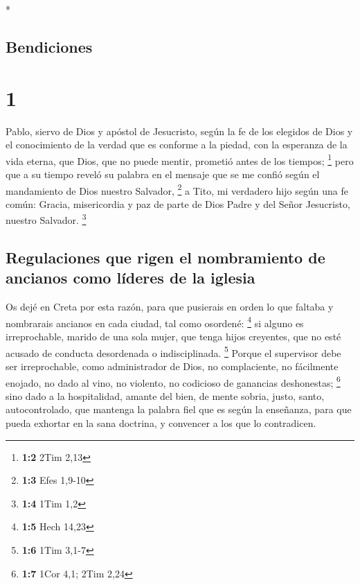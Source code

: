 \begin{paracol}{2} \switchcolumn[0]*

\hypertarget{bendiciones}{%
\subsection{Bendiciones}\label{bendiciones}}

\hypertarget{section}{%
\section{1}\label{section}}

 Pablo, siervo de Dios y apóstol de Jesucristo, según la
fe de los elegidos de Dios y el conocimiento de la verdad que es
conforme a la piedad,  con la esperanza de la vida eterna,
que Dios, que no puede mentir, prometió antes de los tiempos;
\footnote{\textbf{1:2} 2Tim 2,13}  pero que a su tiempo
reveló su palabra en el mensaje que se me confió según el mandamiento de
Dios nuestro Salvador, \footnote{\textbf{1:3} Efes 1,9-10}
 a Tito, mi verdadero hijo según una fe común: Gracia,
misericordia y paz de parte de Dios Padre y del Señor Jesucristo,
nuestro Salvador. \footnote{\textbf{1:4} 1Tim 1,2}

\hypertarget{regulaciones-que-rigen-el-nombramiento-de-ancianos-como-luxedderes-de-la-iglesia}{%
\subsection{Regulaciones que rigen el nombramiento de ancianos como
líderes de la
iglesia}\label{regulaciones-que-rigen-el-nombramiento-de-ancianos-como-luxedderes-de-la-iglesia}}

 Os dejé en Creta por esta razón, para que pusierais en
orden lo que faltaba y nombrarais ancianos en cada ciudad, tal como
osordené: \footnote{\textbf{1:5} Hech 14,23}  si alguno es
irreprochable, marido de una sola mujer, que tenga hijos creyentes, que
no esté acusado de conducta desordenada o indisciplinada. \footnote{\textbf{1:6}
  1Tim 3,1-7}  Porque el supervisor debe ser
irreprochable, como administrador de Dios, no complaciente, no
fácilmente enojado, no dado al vino, no violento, no codicioso de
ganancias deshonestas; \footnote{\textbf{1:7} 1Cor 4,1; 2Tim 2,24}
 sino dado a la hospitalidad, amante del bien, de mente
sobria, justo, santo, autocontrolado,  que mantenga la
palabra fiel que es según la enseñanza, para que pueda exhortar en la
sana doctrina, y convencer a los que lo contradicen.


\end{paracol}
